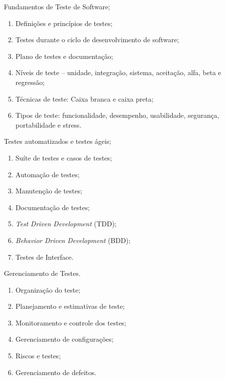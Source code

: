 \begin{pud}
\begin{description}[itemsep=0em]
		\item[UNIDADE IV:] Fundamentos de Teste de Software;
		\begin{enumerate}[itemsep=0em, topsep=0em]
			\item Definições e princípios de testes;
			\item Testes durante o ciclo de desenvolvimento de software;
			\item Plano de testes e documentação;
			\item Níveis de teste – unidade, integração, sistema, aceitação, alfa, beta e regressão;
			\item Técnicas de teste: Caixa branca e caixa preta;
			\item Tipos de teste: funcionalidade, desempenho, usabilidade, segurança,
portabilidade e stress.
		\end{enumerate}
		
		\item[UNIDADE V:] Testes automatizados e testes ágeis;
		\begin{enumerate}[itemsep=0em, topsep=0em]
			\item Suíte de testes e casos de testes;
			\item Automação de testes;
			\item Manutenção de testes;
			\item Documentação de testes;
			\item \textit{Test Driven Development} (TDD);
			\item \textit{Behavior Driven Development} (BDD);
			\item Testes de Interface.
			
		\end{enumerate}
		
		\item[UNIDADE VI:] Gerenciamento de Testes.
		\begin{enumerate}[itemsep=0em, topsep=0em]
			\item Organização do teste;
			\item Planejamento e estimativas de teste;
			\item Monitoramento e controle dos testes;
			\item Gerenciamento de configurações;
			\item Riscos e testes;
			\item Gerenciamento de defeitos.
		\end{enumerate}
		
	\end{description}


\end{pud}
